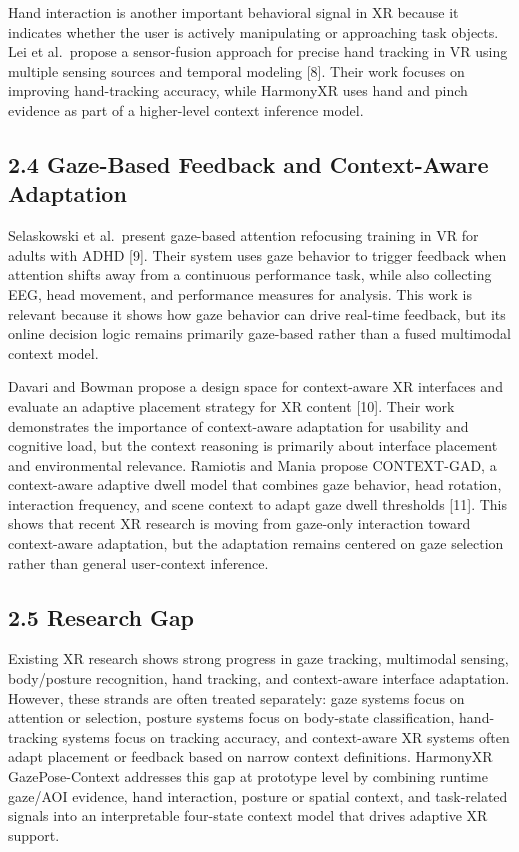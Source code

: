 \documentclass[
  10pt,
]{article}
\begin{document}
Hand interaction is another important behavioral signal in XR because it
indicates whether the user is actively manipulating or approaching task
objects. Lei et al.~propose a sensor-fusion approach for precise hand
tracking in VR using multiple sensing sources and temporal modeling
{[}8{]}. Their work focuses on improving hand-tracking accuracy, while
HarmonyXR uses hand and pinch evidence as part of a higher-level context
inference model.

\subsection{2.4 Gaze-Based Feedback and Context-Aware
Adaptation}\label{gaze-based-feedback-and-context-aware-adaptation}

Selaskowski et al.~present gaze-based attention refocusing training in
VR for adults with ADHD {[}9{]}. Their system uses gaze behavior to
trigger feedback when attention shifts away from a continuous
performance task, while also collecting EEG, head movement, and
performance measures for analysis. This work is relevant because it
shows how gaze behavior can drive real-time feedback, but its online
decision logic remains primarily gaze-based rather than a fused
multimodal context model.

Davari and Bowman propose a design space for context-aware XR interfaces
and evaluate an adaptive placement strategy for XR content {[}10{]}.
Their work demonstrates the importance of context-aware adaptation for
usability and cognitive load, but the context reasoning is primarily
about interface placement and environmental relevance. Ramiotis and
Mania propose CONTEXT-GAD, a context-aware adaptive dwell model that
combines gaze behavior, head rotation, interaction frequency, and scene
context to adapt gaze dwell thresholds {[}11{]}. This shows that recent
XR research is moving from gaze-only interaction toward context-aware
adaptation, but the adaptation remains centered on gaze selection rather
than general user-context inference.

\subsection{2.5 Research Gap}\label{research-gap}

Existing XR research shows strong progress in gaze tracking, multimodal
sensing, body/posture recognition, hand tracking, and context-aware
interface adaptation. However, these strands are often treated
separately: gaze systems focus on attention or selection, posture
systems focus on body-state classification, hand-tracking systems focus
on tracking accuracy, and context-aware XR systems often adapt placement
or feedback based on narrow context definitions. HarmonyXR
GazePose-Context addresses this gap at prototype level by combining
runtime gaze/AOI evidence, hand interaction, posture or spatial context,
and task-related signals into an interpretable four-state context model
that drives adaptive XR support.
\end{document}
